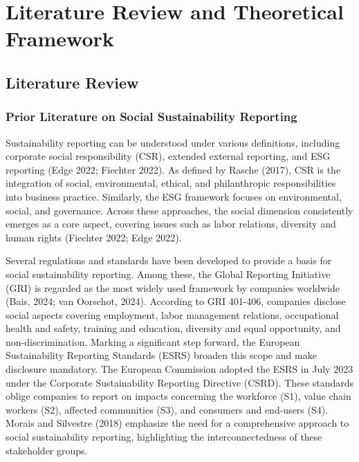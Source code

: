 \chapter{Literature Review and Theoretical Framework}
\label{chap:background}
\section{Literature Review}
\subsection{Prior Literature on Social Sustainability Reporting}

Sustainability reporting can be understood under various definitions, 
including corporate social responsibility (CSR), extended external reporting, 
and ESG reporting (Edge 2022; Fiechter 2022). As defined by Rasche (2017), CSR is the integration of social, 
environmental, ethical, and philanthropic responsibilities into business practice. 
Similarly, the ESG framework focuses on environmental, social, and governance. 
Across these approaches, the social dimension consistently emerges as a core aspect,
covering issues such as labor relations, diversity and human rights (Fiechter 2022; Edge 2022).

Several regulations and standards have been developed to provide a basis for social sustainability reporting.
Among these, the Global Reporting Initiative (GRI) is regarded as the most widely used framework 
by companies worldwide (Bais, 2024; van Oorschot, 2024). 
According to GRI 401-406, companies disclose social aspects covering employment, 
labor management relations, occupational health and safety, training and education, 
diversity and equal opportunity, and non-discrimination. 
Marking a significant step forward, the European Sustainability Reporting Standards (ESRS) 
broaden this scope and make disclosure mandatory. The European Commission adopted the ESRS 
in July 2023 under the Corporate Sustainability Reporting Directive (CSRD). These standards 
oblige companies to report on impacts concerning the workforce (S1), value chain workers (S2), 
affected communities (S3), and consumers and end-users (S4). Morais and Silvestre (2018) 
emphasize the need for a comprehensive approach to social sustainability reporting, highlighting the interconnectedness of these stakeholder groups.

